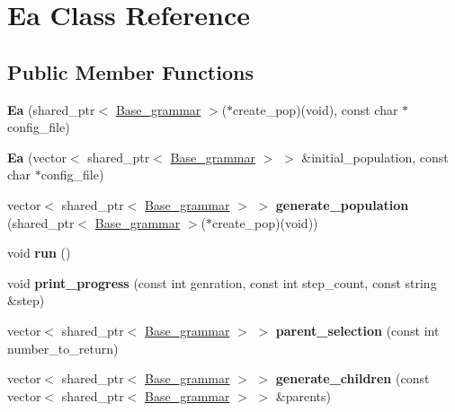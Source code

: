 \hypertarget{classEa}{}\section{Ea Class Reference}
\label{classEa}
\subsection*{Public Member Functions}
\begin{DoxyCompactItemize}
\item 
\mbox{\label{classEa_a5ea1ac0eebfc4da9ecbb258f7d1ac2bf}} 
{\bfseries Ea} (shared\+\_\+ptr$<$ \mbox{\hyperlink{classBase__grammar}{Base\+\_\+grammar}} $>$($\ast$create\+\_\+pop)(void), const char $\ast$config\+\_\+file)
\item 
\mbox{\label{classEa_aed4296b65265fbfdb07869f0c7fc5c77}} 
{\bfseries Ea} (vector$<$ shared\+\_\+ptr$<$ \mbox{\hyperlink{classBase__grammar}{Base\+\_\+grammar}} $>$ $>$ \&initial\+\_\+population, const char $\ast$config\+\_\+file)
\item 
\mbox{\label{classEa_ade72c16beeb6f448e924df0a027bc6ab}} 
vector$<$ shared\+\_\+ptr$<$ \mbox{\hyperlink{classBase__grammar}{Base\+\_\+grammar}} $>$ $>$ {\bfseries generate\+\_\+population} (shared\+\_\+ptr$<$ \mbox{\hyperlink{classBase__grammar}{Base\+\_\+grammar}} $>$($\ast$create\+\_\+pop)(void))
\item 
\mbox{\label{classEa_a03ff195944071a60e495b0de357bb6de}} 
void {\bfseries run} ()
\item 
\mbox{\label{classEa_a1bea3d55dab8a89ce1f5837ec4519589}} 
void {\bfseries print\+\_\+progress} (const int genration, const int step\+\_\+count, const string \&step)
\item 
\mbox{\label{classEa_a303f1c890212c66bd752581af63a6a6c}} 
vector$<$ shared\+\_\+ptr$<$ \mbox{\hyperlink{classBase__grammar}{Base\+\_\+grammar}} $>$ $>$ {\bfseries parent\+\_\+selection} (const int number\+\_\+to\+\_\+return)
\item 
\mbox{\label{classEa_afd0f58450001e82bc99b0e8edb0d44d2}} 
vector$<$ shared\+\_\+ptr$<$ \mbox{\hyperlink{classBase__grammar}{Base\+\_\+grammar}} $>$ $>$ {\bfseries generate\+\_\+children} (const vector$<$ shared\+\_\+ptr$<$ \mbox{\hyperlink{classBase__grammar}{Base\+\_\+grammar}} $>$ $>$ \&parents)

\end{DoxyCompactItemize}
